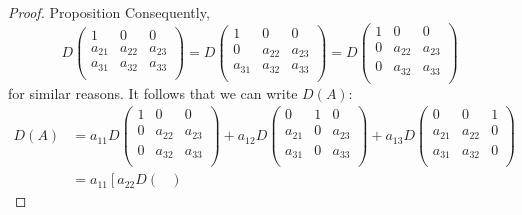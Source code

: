 \begin{proof} {Proposition}
    Consequently,  \[
        D\begin{pmatrix}
            1      & 0      & 0      \\
            a_{21} & a_{22} & a_{23} \\
            a_{31} & a_{32} & a_{33} \\
        \end{pmatrix}  =  D\begin{pmatrix}
            1      & 0      & 0      \\
            0      & a_{22} & a_{23} \\
            a_{31} & a_{32} & a_{33} \\
        \end{pmatrix} = D\begin{pmatrix}
            1 & 0      & 0      \\
            0 & a_{22} & a_{23} \\
            0 & a_{32} & a_{33} \\
        \end{pmatrix}
    \]
    for similar reasons. It follows that we can write \(D(A)\):
    \begin{align*}
        D(A) & = a_{11} D\begin{pmatrix}
                             1 & 0      & 0      \\
                             0 & a_{22} & a_{23} \\
                             0 & a_{32} & a_{33} \\
                         \end{pmatrix}
        + a_{12}D\begin{pmatrix}
                     0      & 1 & 0      \\
                     a_{21} & 0 & a_{23} \\
                     a_{31} & 0 & a_{33} \\
                 \end{pmatrix}
        + a_{13}D\begin{pmatrix}
                     0      & 0      & 1 \\
                     a_{21} & a_{22} & 0 \\
                     a_{31} & a_{32} & 0 \\
                 \end{pmatrix}                     \\
             & = a_{11} \left[a_{22}D\begin{pmatrix}

\end{pmatrix}
\end{align*}
\end{proof}
